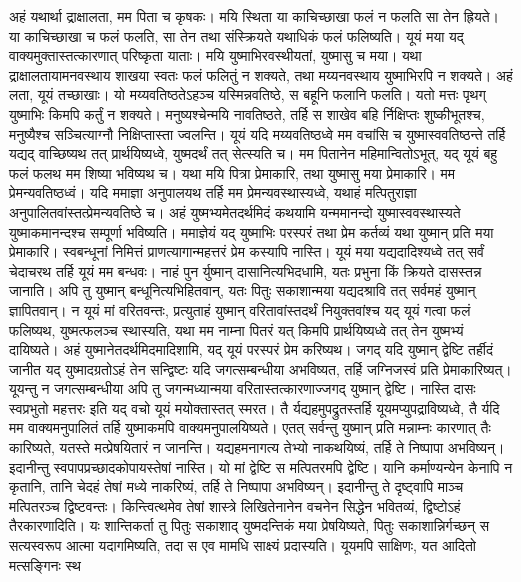 \adhyAya
{}
\vakya अहं यथार्था द्राक्षालता, मम पिता च कृषकः।
\vakya मयि स्थिता या काचिच्छाखा फलं न फलति सा तेन ह्रियते। या काचिच्छाखा च फलं फलति, सा तेन तथा संस्क्रियते यथाधिकं फलं फलिष्यति।
\vakya यूयं मया यद् वाक्यमुक्तास्तत्कारणात् परिष्कृता याताः।
\vakya मयि युष्माभिरवस्थीयतां, युष्मासु च मया। यथा द्राक्षालतायामनवस्थाय शाखया स्वतः फलं फलितुं न शक्यते, तथा मय्यनवस्थाय युष्माभिरपि न शक्यते।
\vakya अहं लता, यूयं तच्छाखाः। यो मय्यवतिष्ठतेऽहञ्च यस्मिन्नवतिष्ठे, स बहूनि फलानि फलति। यतो मत्तः पृथग् युष्माभिः किमपि कर्तुं न शक्यते।
\vakya मनुष्यश्चेन्मयि नावतिष्ठते, तर्हि स शाखेव बहि र्निक्षिप्तः शुष्कीभूतश्च, मनुष्यैश्च सञ्चित्याग्नौ निक्षिप्तास्ता ज्वलन्ति।
\vakya यूयं यदि मय्यवतिष्ठध्वे मम वचांसि च युष्मास्ववतिष्ठन्ते तर्हि यद्यद् वाच्छिष्यथ तत् प्रार्थयिष्यध्वे, युष्मदर्थं तत् सेत्स्यति च।
\vakya मम पितानेन महिमान्वितोऽभूत्, यद् यूयं बहु फलं फलथ मम शिष्या भविष्यथ च।
\vakya यथा मयि पित्रा प्रेमाकारि, तथा युष्मासु मया प्रेमाकारि। मम प्रेमन्यवतिष्ठध्वं।
\vakya यदि ममाज्ञा अनुपालयथ तर्हि मम प्रेमन्यवस्थास्यध्वे, यथाहं मत्पितुराज्ञा अनुपालितवांस्तत्प्रेमन्यवतिष्ठे च।
\vakya अहं युष्मभ्यमेतदर्थमिदं कथयामि यन्ममानन्दो युष्मास्ववस्थास्यते युष्माकमानन्दश्च सम्पूर्णा भविष्यति।
\vakya ममाज्ञेयं यद् युष्माभिः परस्परं तथा प्रेम कर्तव्यं यथा युष्मान् प्रति मया प्रेमाकारि।
\vakya स्वबन्धूनां निमित्तं प्राणत्यागान्महत्तरं प्रेम कस्यापि नास्ति।
\vakya यूयं मया यद्यदादिश्यध्वे तत् सर्वं चेदाचरथ तर्हि यूयं मम बन्धवः।
\vakya नाहं पुन र्युष्मान् दासानित्यभिदधामि, यतः प्रभुना किं क्रियते दासस्तन्न जानाति। अपि तु युष्मान् बन्धूनित्यभिहितवान्, यतः पितुः सकाशान्मया यद्यदश्रावि तत् सर्वमहं युष्मान् ज्ञापितवान्।
\vakya न यूयं मां वरितवन्तः, प्रत्युताहं युष्मान् वरितावांस्तदर्थं नियुक्तवांश्च यद् यूयं गत्वा फलं फलिष्यथ, युष्मत्फलञ्च स्थास्यति, यथा मम नाम्ना पितरं यत् किमपि प्रार्थयिष्यध्वे तत् तेन युष्मभ्यं दायिष्यते।
\vakya अहं युष्मानेतदर्थमिदमादिशामि, यद् यूयं परस्परं प्रेम करिष्यथ।
\vakya जगद् यदि युष्मान् द्वेष्टि तर्हीदं जानीत यद् युष्मादग्रतोऽहं तेन सन्द्विष्टः
\vakya यदि जगत्सम्बन्धीया अभविष्यत, तर्हि जग्निजस्वं प्रति प्रेमाकारिष्यत्। यूयन्तु न जगत्सम्बन्धीया अपि तु जगन्मध्यान्मया वरितास्तत्कारणाज्जगद् युष्मान् द्वेष्टि।
\vakya नास्ति दासः स्वप्रभुतो महत्तरः इति यद् वचो यूयं मयोक्तास्तत् स्मरत। तै र्यद्यहमुपद्रुतस्तर्हि यूयमप्युपद्राविष्यध्वे, तै र्यदि मम वाक्यमनुपालितं तर्हि युष्माकमपि वाक्यमनुपालयिष्यते।
\vakya एतत् सर्वन्तु युष्मान् प्रति मन्नाम्नः कारणात् तैः कारिष्यते, यतस्ते मत्प्रेषयितारं न जानन्ति।
\vakya यद्यहमनागत्य तेभ्यो नाकथयिष्यं, तर्हि ते निष्पापा अभविष्यन्। इदानीन्तु स्वपापप्रच्छादकोपायस्तेषां नास्ति।
\vakya यो मां द्वेष्टि स मत्पितरमपि द्वेष्टि।
\vakya यानि कर्माण्यन्येन केनापि न कृतानि, तानि चेदहं तेषां मध्ये नाकरिष्यं, तर्हि ते निष्पापा अभविष्यन्। इदानीन्तु ते दृष्ट्वापि माञ्च मत्पितरञ्च द्विष्टवन्तः।
\vakya किन्त्वित्थमेव तेषां शास्त्रे लिखितेनानेन वचनेन सिद्धेन भवितव्यं, द्विष्टोऽहं तैरकारणादिति।
\vakya यः शान्तिकर्ता तु पितुः सकाशाद् युष्मदन्तिकं मया प्रेषयिष्यते, पितुः सकाशान्निर्गच्छन् स सत्यस्वरूप आत्मा यदागमिष्यति, तदा स एव मामधि साक्ष्यं प्रदास्यति।
\vakya यूयमपि साक्षिणः, यत आदितो मत्सङ्गिनः स्थ\eoc